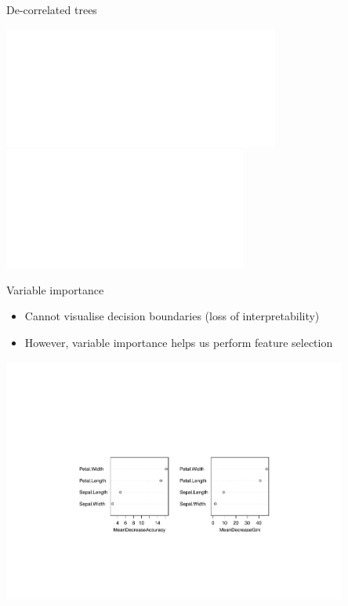 \documentclass[pdf]{beamer}
\begin{document}
\begin{frame}{De-correlated trees}
	\begin{center}
		\includegraphics<1>[width=0.68\textwidth]{treeFit1.pdf}
		\includegraphics<2>[width=0.6\textwidth]{treeFit2.pdf}
	\end{center}
\end{frame}

\begin{frame}{Variable importance}
\begin{itemize}\addtolength{\itemsep}{2\baselineskip}
	\item Cannot visualise decision boundaries (loss of interpretability)
	\item However, variable importance helps us perform feature selection 
\end{itemize}

\begin{center}
	\includegraphics[width=0.85\textwidth]{varImportance.pdf}
\end{center}
\end{frame}
\end{document}
